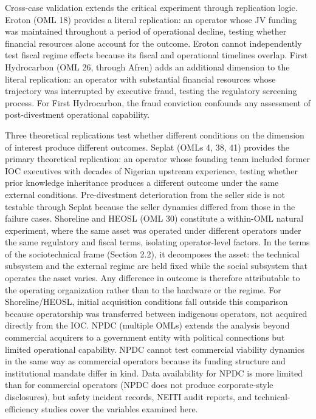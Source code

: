 \documentclass[twoside,fontset=lmodern]{mitthesis}
\begin{document}
Cross-case validation extends the critical experiment through
replication logic. Eroton (OML 18) provides a literal replication: an
operator whose JV funding was maintained throughout a period of
operational decline, testing whether financial resources alone account
for the outcome. Eroton cannot independently test fiscal regime effects
because its fiscal and operational timelines overlap. First Hydrocarbon
(OML 26, through Afren) adds an additional dimension to the literal
replication: an operator with substantial financial resources whose
trajectory was interrupted by executive fraud, testing the regulatory
screening process. For First Hydrocarbon, the fraud conviction confounds
any assessment of post-divestment operational capability.

Three theoretical replications test whether different conditions on the
dimension of interest produce different outcomes. Seplat (OMLs 4, 38,
41) provides the primary theoretical replication: an operator whose
founding team included former IOC executives with decades of Nigerian
upstream experience, testing whether prior knowledge inheritance
produces a different outcome under the same external conditions.
Pre-divestment deterioration from the seller side is not testable
through Seplat because the seller dynamics differed from those in the
failure cases. Shoreline and HEOSL (OML 30) constitute a within-OML
natural experiment, where the same asset was operated under different
operators under the same regulatory and fiscal terms, isolating
operator-level factors. In the terms of the sociotechnical frame
(Section 2.2), it decomposes the asset: the technical subsystem and the
external regime are held fixed while the social subsystem that operates
the asset varies. Any difference in outcome is therefore attributable to
the operating organization rather than to the hardware or the regime.
For Shoreline/HEOSL, initial acquisition conditions fall outside this
comparison because operatorship was transferred between indigenous
operators, not acquired directly from the IOC. NPDC (multiple OMLs)
extends the analysis beyond commercial acquirers to a government entity
with political connections but limited operational capability. NPDC
cannot test commercial viability dynamics in the same way as commercial
operators because its funding structure and institutional mandate differ
in kind. Data availability for NPDC is more limited than for commercial
operators (NPDC does not produce corporate-style disclosures), but
safety incident records, NEITI audit reports, and technical-efficiency
studies cover the variables examined here.
\end{document}

